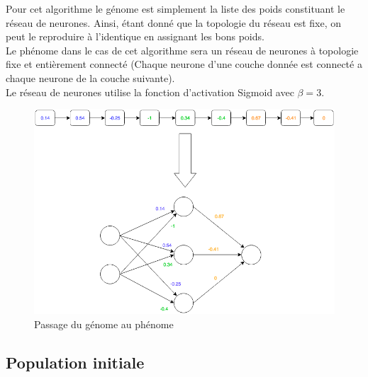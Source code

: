 \documentclass{article}
\begin{document}
Pour cet algorithme le génome est simplement la liste des poids constituant le réseau de neurones. Ainsi, étant donné que la topologie du réseau est fixe, on peut le reproduire à l'identique en assignant les bons poids.\\

Le phénome dans le cas de cet algorithme sera un réseau de neurones à topologie fixe et entièrement connecté (Chaque neurone d'une couche donnée est connecté a chaque neurone de la couche suivante).\\

Le réseau de neurones utilise la fonction d'activation Sigmoid avec $\beta = 3$.

\begin{figure}[H]
\begin{center}
	\includegraphics[scale=0.5]{genomephenome.png}
	\caption{Passage du génome au phénome}
\end{center}
\end{figure}

\subsection{Population initiale}
\end{document}
